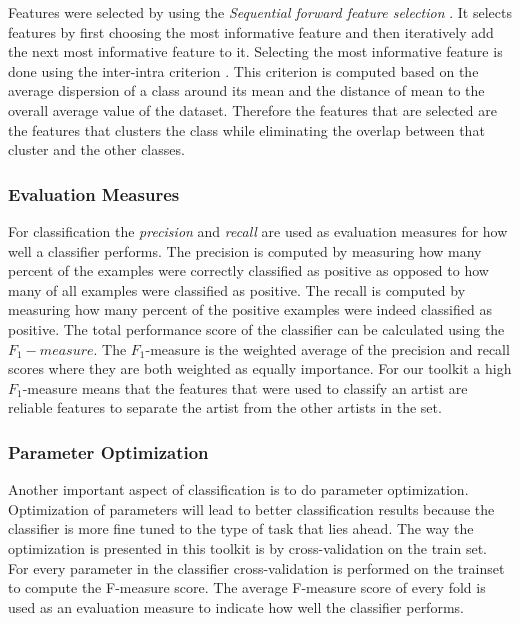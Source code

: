 Features were selected by using the \textit{Sequential forward feature selection} \cite{pudil1994floating}.
It selects features by first choosing the most informative feature and then iteratively add the next most informative feature to it.
Selecting the most informative feature is done using the inter-intra criterion \cite{pekalska2005pairwise}.
This criterion is computed based on the average dispersion of a class around its mean and the distance of mean to the overall average value of the dataset.
Therefore the features that are selected are the features that clusters the class while eliminating the overlap between that cluster and the other classes.

\subsubsection{Evaluation Measures}
For classification the \textit{precision} and \textit{recall} are used as evaluation measures for how well a classifier performs.
The precision is computed by measuring how many percent of the examples were correctly classified as positive as opposed to how many of all examples were classified as positive.
The recall is computed by measuring how many percent of the positive examples were indeed classified as positive.
The total performance score of the classifier can be calculated using the $F_1-measure$.
The $F_1$-measure is the weighted average of the precision and recall scores where they are both weighted as equally importance.
For our toolkit a high $F_1$-measure means that the features that were used to classify an artist are reliable features to separate the artist from the other artists in the set.

\subsubsection{Parameter Optimization}
Another important aspect of classification is to do parameter optimization. 
Optimization of parameters will lead to better classification results because the classifier is more fine tuned to the type of task that lies ahead. 
The way the optimization is presented in this toolkit is by cross-validation on the train set.
For every parameter in the classifier cross-validation is performed on the trainset to compute the F-measure score.
The average F-measure score of every fold is used as an evaluation measure to indicate how well the classifier performs.


